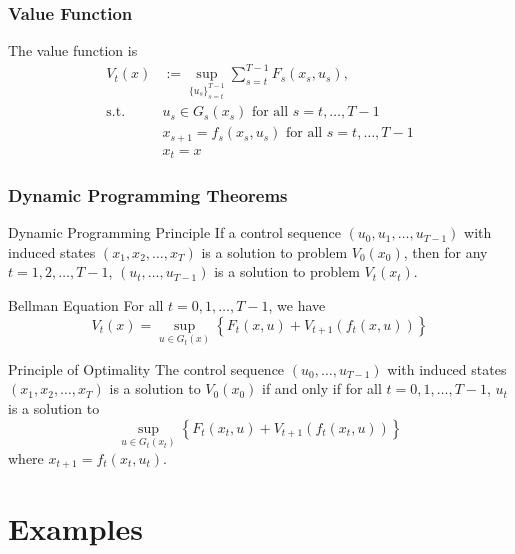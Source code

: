 \documentclass[9pt,aspectratio=169]{beamer}
\begin{document}
\begin{frame}
    \frametitle{Value Function}
    The value function is
    \begin{align*}
        V_t(x) &:= \sup_{\{u_s\}_{s=t}^{T-1}} \sum_{s=t}^{T-1} F_s(x_s,u_s),\\
        \text{s.t. } &u_s \in G_s(x_s) \text{ for all } s = t,
        \ldots, T-1\\
        &x_{s+1}=f_s(x_s,u_s)\text{ for all }s=t,\ldots,T-1\\
        &x_t = x
    \end{align*}
\end{frame}

\begin{frame}
    \frametitle{Dynamic Programming Theorems}
    \begin{block}{Dynamic Programming Principle}
        If a control sequence $(u_0, u_1, \ldots, u_{T-1})$ with induced
        states $(x_1, x_2, \ldots, x_T)$ is a solution to problem $V_0(x_0)$,
        then for any $t = 1, 2, \ldots, T-1$, $(u_t, \ldots, u_{T-1})$ is a
        solution to problem $V_t(x_t)$.
    \end{block}
    
    \begin{block}{Bellman Equation}
        For all $t = 0, 1, \ldots, T-1$, we have
        \begin{equation*}
            V_t(x) = \sup_{u \in G_t(x)} \left\{F_t(x, u) + V_{t+1}(f_t(x,
                u))\right\}
        \end{equation*}
    \end{block}

    \begin{block}{Principle of Optimality}
        The control sequence $(u_0, \ldots, u_{T-1})$ with induced states
        $(x_1, x_2, \ldots, x_T)$ is a solution to $V_0(x_0)$ if and only if
        for all $t = 0, 1, \ldots, T-1$, $u_t$ is a solution to
        \begin{equation*}
            \sup_{u \in G_t(x_t)} \left\{ F_t(x_t, u) + V_{t+1}(f_t(x_t, u))
            \right\}
        \end{equation*}
        where $x_{t+1} = f_t(x_t, u_t)$.
    \end{block}
\end{frame}


\section{Examples}
\end{document}
